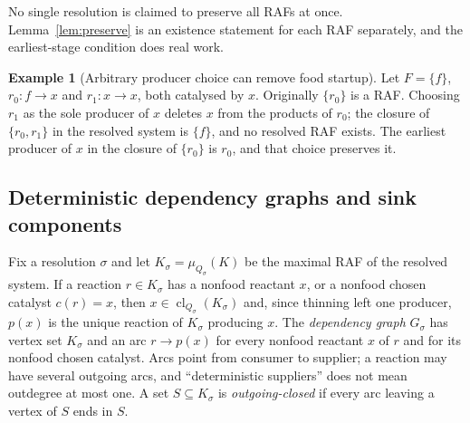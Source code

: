 \documentclass[11pt,a4paper]{article}
\theoremstyle{plain}
\theoremstyle{definition}
\newtheorem{example}[theorem]{Example}
\theoremstyle{remark}
\newcommand{\cl}{\operatorname{cl}}
\begin{document}
No single resolution is claimed to preserve all RAFs at once. Lemma~\ref{lem:preserve} is an existence statement for each RAF separately, and the earliest-stage condition does real work.

\begin{example}[Arbitrary producer choice can remove food startup]\label{ex:earliest}
Let $F=\{f\}$, $r_0\colon f\to x$ and $r_1\colon x\to x$, both catalysed by $x$. Originally $\{r_0\}$ is a RAF. Choosing $r_1$ as the sole producer of $x$ deletes $x$ from the products of $r_0$; the closure of $\{r_0,r_1\}$ in the resolved system is $\{f\}$, and no resolved RAF exists. The earliest producer of $x$ in the closure of $\{r_0\}$ is $r_0$, and that choice preserves it.
\end{example}

\subsection{Deterministic dependency graphs and sink components}

Fix a resolution $\sigma$ and let $K_\sigma=\mu_{Q_\sigma}(K)$ be the maximal RAF of the resolved system. If a reaction $r\in K_\sigma$ has a nonfood reactant $x$, or a nonfood chosen catalyst $c(r)=x$, then $x\in\cl_{Q_\sigma}(K_\sigma)$ and, since thinning left one producer, $p(x)$ is the unique reaction of $K_\sigma$ producing $x$. The \emph{dependency graph} $G_\sigma$ has vertex set $K_\sigma$ and an arc $r\to p(x)$ for every nonfood reactant $x$ of $r$ and for its nonfood chosen catalyst. Arcs point from consumer to supplier; a reaction may have several outgoing arcs, and ``deterministic suppliers'' does not mean outdegree at most one. A set $S\subseteq K_\sigma$ is \emph{outgoing-closed} if every arc leaving a vertex of $S$ ends in $S$.
\end{document}
